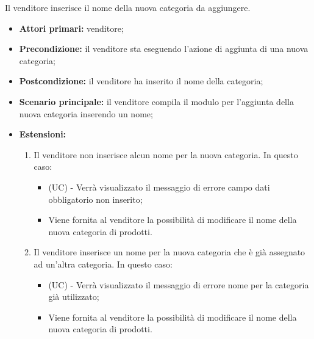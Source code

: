 Il venditore inserisce il nome della nuova categoria da aggiungere.
\begin{itemize}
    \item \textbf{Attori primari:} venditore;
    \item \textbf{Precondizione:} il venditore sta eseguendo l'azione di aggiunta di una nuova categoria;
    \item \textbf{Postcondizione:} il venditore ha inserito il nome della categoria;
    \item \textbf{Scenario principale:} il venditore compila il modulo per l'aggiunta della nuova categoria inserendo un nome;
    \item \textbf{Estensioni:}
    \begin{enumerate}[label=\lett]
    	\item Il venditore non inserisce alcun nome per la nuova categoria. In questo caso:
    	\begin{itemize}
    		\item (UC) - Verrà visualizzato il messaggio di errore campo dati obbligatorio non inserito;
    		\item Viene fornita al venditore la possibilità di modificare il nome della nuova categoria di prodotti.
    	\end{itemize}
    	\item Il venditore inserisce un nome per la nuova categoria che è già assegnato ad un'altra categoria. In questo caso:
    	\begin{itemize}
    		\item (UC) - Verrà visualizzato il messaggio di errore nome per la categoria già utilizzato;
    		\item Viene fornita al venditore la possibilità di modificare il nome della nuova categoria di prodotti.
    	\end{itemize}
    \end{enumerate}
\end{itemize}

